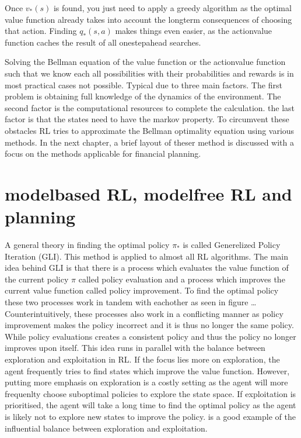 \documentclass[letterpaper,10pt,english]{jupyterBook}
\begin{document}
\sphinxAtStartPar
Once \(v_*(s)\) is found, you just need to apply a greedy algorithm as the optimal value function already takes into account the long\sphinxhyphen{}term consequences of choosing that action. Finding \(q_*(s,a)\) makes things even easier, as the action\sphinxhyphen{}value function caches the result of all one\sphinxhyphen{}step\sphinxhyphen{}ahead searches.

\sphinxAtStartPar
Solving the Bellman equation of the value function or the action\sphinxhyphen{}value function such that we know each all possibilities with their probabilities and rewards is in most practical cases not possible. Typical due to three main factors. The first problem is obtaining full knowledge of the dynamics of the environment. The second factor is the computational resources to complete the calculation. the last factor is that the states need to have the markov property.   To circumvent these obstacles RL tries to approximate the Bellman optimality equation using various methods. In the next chapter, a brief layout of theser method is discussed with a focus on the methods applicable for financial planning.


\section{model\sphinxhyphen{}based RL, model\sphinxhyphen{}free RL and planning}
\label{\detokenize{Reinforcement_learning:model-based-rl-model-free-rl-and-planning}}
\sphinxAtStartPar
A general theory in finding the optimal policy \(\pi_*\) is called Generelized Policy Iteration (GLI). This method is applied to almost all RL algorithms. The main idea behind GLI is that there is a process which evaluates the value function of the current policy \(\pi\) called policy evaluation and a process which improves the current value function called policy improvement. To find the optimal policy these two processes work in tandem with eachother as seen in figure … Counterintuitively, these processes also work in a conflicting manner as policy improvement makes the policy incorrect and it is thus no longer the same policy. While policy evaluations creates a consistent policy and thus the policy no longer improves upon itself. This idea runs in parallel with the balance between exploration and exploitation in RL.  If the focus lies more on exploration, the agent frequently tries to find states which improve the value function. However, putting more emphasis on exploration is a costly setting as the agent will more frequenlty choose suboptimal policies to explore the state space. If exploitation is prioritised, the agent will take a long time to find the optimal policy as the agent is likely not to explore new states to improve the policy.  is a good example of the influential balance between exploration and exploitation.
\end{document}
